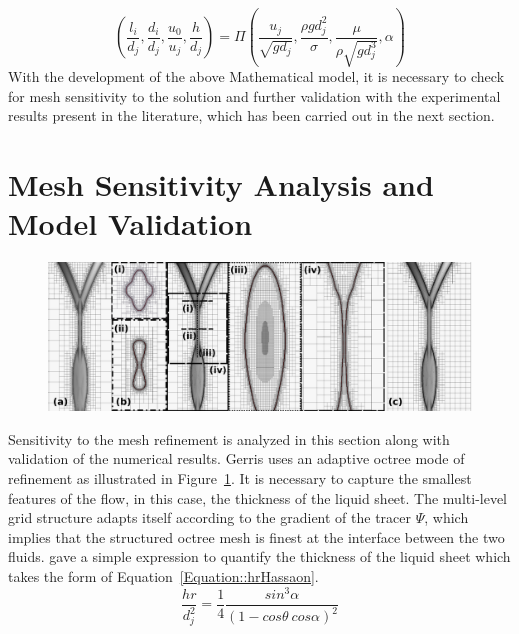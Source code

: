 \documentclass[%
aip,
sd,%
amsmath,amssymb,
preprint,%
author-year,%
]{revtex4-1}
\begin{document}
\begin{equation}\label{Equation::Pi}
\left(\frac{l_i}{d_j},\frac{d_i}{d_j},\frac{u_0}{u_j},\frac{h}{d_j}\right) = \Pi\left(\frac{u_j}{\sqrt{gd_j}},\frac{\rho gd_j^2}{\sigma},\frac{\mu}{\rho\sqrt{gd_j^3}},\alpha\right)
\end{equation}
With the development of the above Mathematical model, it is necessary to check for mesh sensitivity to the solution and further validation with the experimental results present in the literature, which has been carried out in the next section.
\section{ Mesh Sensitivity Analysis and Model Validation}
\begin{figure}
	\centering
	\includegraphics[width=\linewidth]{figGIS}
	\caption{}
	\label{Figure::GISfigures}
\end{figure}
Sensitivity to the mesh refinement is analyzed in this section along with validation of the numerical results. Gerris uses an adaptive octree mode of refinement as illustrated in Figure~\ref{Figure::GISfigures}. It is necessary to capture the smallest features of the flow, in this case, the thickness of the liquid sheet. The multi-level grid structure adapts itself according to the gradient of the tracer $\Psi$, which implies that the structured octree mesh is finest at the interface between the two fluids. \cite{hasson1964thickness} gave a simple expression to quantify the thickness of the liquid sheet which takes the form of Equation~\ref{Equation::hrHassaon}.
\begin{equation}\label{Equation::hrHassaon}
\frac{hr}{d_j^2} = 	\frac{1}{4}\frac{sin^3\alpha}{(1-cos\theta\:cos\alpha)^2}
\end{equation}
\end{document}
